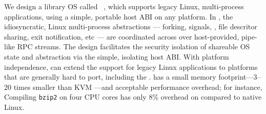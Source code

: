 We design a library OS called \term{\graphene{}}~\citep{tsai14graphene},
which supports legacy Linux, multi-process applications,
using a simple, portable host ABI on any platform.
In \graphene{},
the idiosyncratic, Linux multi-process abstractions
--- forking, signals, \sysvipc{}, file descritor sharing, exit notification, etc
--- are coordinated across \picoprocs{}
over host-provided, pipe-like RPC streams.
The design facilitates the security isolation of shareable OS state and abstraction
via the simple, isolating host ABI.
With platform independence, \graphene{}
can extend the support for legacy Linux applications
to platforms that are generally hard to port,
including the .
\graphene{} has a small memory footprint---3--20 times smaller than KVM
---and acceptable performance overhead;
for instance, Compiling {\tt bzip2} on four CPU cores has only 8\% overhead on \graphene{} compared to native Linux.


